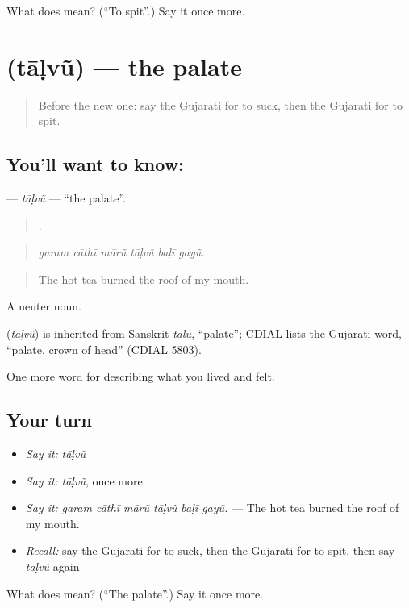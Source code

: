\begin{tcolorbox}[breakable,colback=teal!4,colframe=teal!35!black,title={Before you move on}]
What does  mean? (\textquotedblleft{}To spit\textquotedblright{}.) Say it once more.
\end{tcolorbox}
\section[\texorpdfstring{\gu{તાળવું} (tāḷvũ)}{તાળવું (tāḷvũ)}]{ (tāḷvũ) — the palate}

\label{lesson:GU-C474-talvu}



\begin{quote}
Before the new one: say the Gujarati for to suck, then the Gujarati for to spit.
\end{quote}

\subsection*{You'll want to know: }
\textbf{} — \emph{tāḷvũ} — \textquotedblleft{}the palate\textquotedblright{}.

\begin{quote}
     .
\end{quote}

\begin{quote}
\emph{garam cāthī mārũ tāḷvũ baḷī gayũ.}
\end{quote}

\begin{quote}
The hot tea burned the roof of my mouth.
\end{quote}

A neuter noun.

\begin{cousinweb}
\textbf{} (\emph{tāḷvũ}) is inherited from Sanskrit \emph{tālu}, \textquotedblleft{}palate\textquotedblright{}; CDIAL lists the Gujarati word, \textquotedblleft{}palate, crown of head\textquotedblright{} (CDIAL 5803).
\end{cousinweb}

\begin{grammarlens}[title={What you've built}]
One more word for describing what you lived and felt.
\end{grammarlens}

\subsection*{Your turn}
\begin{itemize}
\raggedright
  \item \emph{Say it:} \emph{tāḷvũ}
  \item \emph{Say it:} \emph{tāḷvũ}, once more
  \item \emph{Say it:} \emph{garam cāthī mārũ tāḷvũ baḷī gayũ.} — The hot tea burned the roof of my mouth.
  \item \emph{Recall:} say the Gujarati for to suck, then the Gujarati for to spit, then say \emph{tāḷvũ} again
\end{itemize}

\begin{tcolorbox}[breakable,colback=teal!4,colframe=teal!35!black,title={Before you move on}]
What does  mean? (\textquotedblleft{}The palate\textquotedblright{}.) Say it once more.
\end{tcolorbox}
